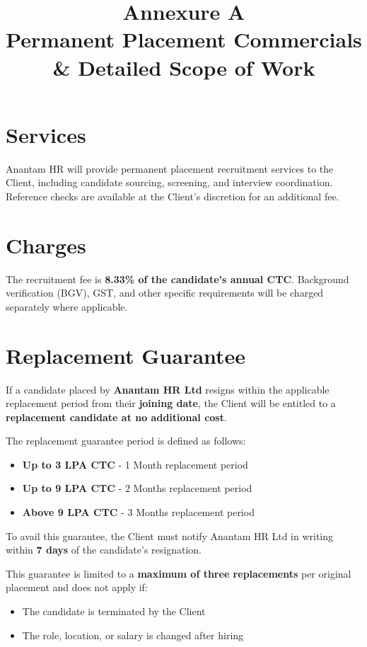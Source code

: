 \documentclass[12pt]{article}
\title{
\vspace{-1cm}
\textcolor{primary}{\Huge \textbf{Annexure A}} \\
\vspace{0.4cm}
\Large Permanent Placement Commercials \\
\Large \& Detailed Scope of Work
}
\date{}
\begin{document}
\maketitle
\thispagestyle{fancy}


\section{Services}

Anantam HR will provide permanent placement recruitment services to the Client, including candidate sourcing, screening, and interview coordination. Reference checks are available at the Client's discretion for an additional fee.

\section{Charges}

The recruitment fee is \textbf{8.33\% of the candidate's annual CTC}. Background verification (BGV), GST, and other specific requirements will be charged separately where applicable.

\section{Replacement Guarantee}

If a candidate placed by \textbf{Anantam HR Ltd} resigns within the applicable replacement period from their \textbf{joining date}, the Client will be entitled to a \textbf{replacement candidate at no additional cost}.

The replacement guarantee period is defined as follows:

\begin{itemize}[leftmargin=1.2cm]
\item \textbf{Up to 3 LPA CTC} - 1 Month replacement period
\item \textbf{Up to 9 LPA CTC} - 2 Months replacement period
\item \textbf{Above 9 LPA CTC} - 3 Months replacement period
\end{itemize}

To avail this guarantee, the Client must notify Anantam HR Ltd in writing within \textbf{7 days} of the candidate's resignation.

This guarantee is limited to a \textbf{maximum of three replacements} per original placement and does not apply if:

\begin{itemize}
\item The candidate is terminated by the Client
\item The role, location, or salary is changed after hiring
\end{itemize}
\end{document}
